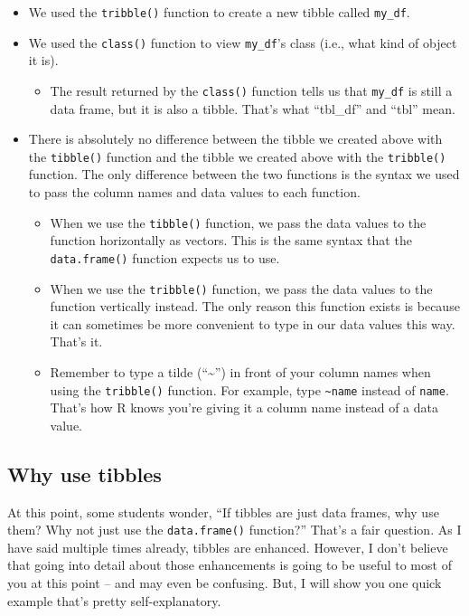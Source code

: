 \documentclass[
  letterpaper,
  DIV=11,
  numbers=noendperiod]{scrreprt}
\providecommand{\tightlist}{%
  \setlength{\itemsep}{0pt}\setlength{\parskip}{0pt}}\usepackage{longtable,booktabs,array}
\begin{document}
\begin{itemize}
\item
  We used the \texttt{tribble()} function to create a new tibble called
  \texttt{my\_df}.
\item
  We used the \texttt{class()} function to view \texttt{my\_df}'s class
  (i.e., what kind of object it is).

  \begin{itemize}
  \tightlist
  \item
    The result returned by the \texttt{class()} function tells us that
    \texttt{my\_df} is still a data frame, but it is also a tibble.
    That's what ``tbl\_df'' and ``tbl'' mean.
  \end{itemize}
\item
  There is absolutely no difference between the tibble we created above
  with the \texttt{tibble()} function and the tibble we created above
  with the \texttt{tribble()} function. The only difference between the
  two functions is the syntax we used to pass the column names and data
  values to each function.

  \begin{itemize}
  \item
    When we use the \texttt{tibble()} function, we pass the data values
    to the function horizontally as vectors. This is the same syntax
    that the \texttt{data.frame()} function expects us to use.
  \item
    When we use the \texttt{tribble()} function, we pass the data values
    to the function vertically instead. The only reason this function
    exists is because it can sometimes be more convenient to type in our
    data values this way. That's it.
  \item
    Remember to type a tilde (``\textasciitilde{}'') in front of your
    column names when using the \texttt{tribble()} function. For
    example, type \texttt{\textasciitilde{}name} instead of
    \texttt{name}. That's how R knows you're giving it a column name
    instead of a data value.
  \end{itemize}
\end{itemize}

\subsection{Why use tibbles}\label{why-use-tibbles}

At this point, some students wonder, ``If tibbles are just data frames,
why use them? Why not just use the \texttt{data.frame()} function?''
That's a fair question. As I have said multiple times already, tibbles
are enhanced. However, I don't believe that going into detail about
those enhancements is going to be useful to most of you at this point --
and may even be confusing. But, I will show you one quick example that's
pretty self-explanatory.
\end{document}

